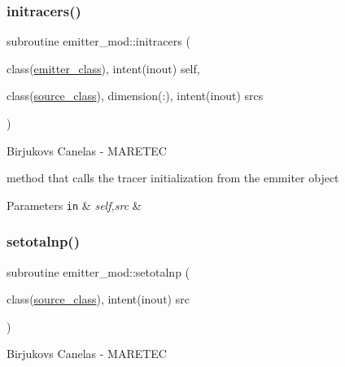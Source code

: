 \subsubsection{\texorpdfstring{initracers()}{initracers()}}
{\footnotesize\ttfamily subroutine emitter\+\_\+mod\+::initracers (\begin{DoxyParamCaption}\item[{class(\hyperlink{structemitter__mod_1_1emitter__class}{emitter\+\_\+class}), intent(inout)}]{self,  }\item[{class(\hyperlink{structsources__mod_1_1source__class}{source\+\_\+class}), dimension(\+:), intent(inout)}]{srcs }\end{DoxyParamCaption})\hspace{0.3cm}{\ttfamily [private]}}



Birjukovs Canelas -\/ M\+A\+R\+E\+T\+EC 

method that calls the tracer initialization from the emmiter object 
\begin{DoxyParams}[1]{Parameters}
\mbox{\tt in}  & {\em self,src} & \\
\hline
\end{DoxyParams}
\mbox{\label{namespaceemitter__mod_a5c219dd6692a761ad4bf968ae750fcc6}} 
\subsubsection{\texorpdfstring{setotalnp()}{setotalnp()}}
{\footnotesize\ttfamily subroutine emitter\+\_\+mod\+::setotalnp (\begin{DoxyParamCaption}\item[{class(\hyperlink{structsources__mod_1_1source__class}{source\+\_\+class}), intent(inout)}]{src }\end{DoxyParamCaption})\hspace{0.3cm}{\ttfamily [private]}}



Birjukovs Canelas -\/ M\+A\+R\+E\+T\+EC 

